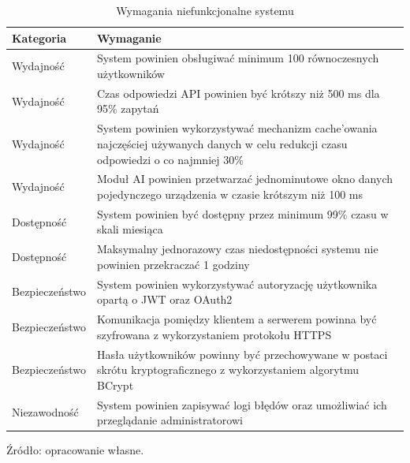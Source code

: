 \begin{table}[H]
	\centering
	\caption{Wymagania niefunkcjonalne systemu}
	\label{tab:nonfunctional-requirements}
	\vspace{10pt}
	
	\begin{tabular}{p{3cm} p{10cm}}
		\toprule
		Kategoria & Wymaganie \\
		\midrule
		
		Wydajność & System powinien obsługiwać minimum 100 równoczesnych użytkowników \\
		
		Wydajność & Czas odpowiedzi API powinien być krótszy niż 500 ms dla 95\% zapytań \\
		
		Wydajność & System powinien wykorzystywać mechanizm cache’owania najczęściej używanych danych w celu redukcji czasu odpowiedzi o co najmniej 30\% \\
		
		Wydajność & Moduł AI powinien przetwarzać jednominutowe okno danych pojedynczego urządzenia w czasie krótszym niż 100 ms \\
		
		Dostępność & System powinien być dostępny przez minimum 99\% czasu w skali miesiąca \\
		
		Dostępność & Maksymalny jednorazowy czas niedostępności systemu nie powinien przekraczać 1 godziny \\
		
		Bezpieczeństwo & System powinien wykorzystywać autoryzację użytkownika opartą o JWT oraz OAuth2 \\
		
		Bezpieczeństwo & Komunikacja pomiędzy klientem a serwerem powinna być szyfrowana z wykorzystaniem protokołu HTTPS \\
		
		Bezpieczeństwo & Hasła użytkowników powinny być przechowywane w postaci skrótu kryptograficznego z wykorzystaniem algorytmu BCrypt \\
		
		Niezawodność & System powinien zapisywać logi błędów oraz umożliwiać ich przeglądanie administratorowi \\
		
		\bottomrule
	\end{tabular}
	
	\vspace{10pt}
	\small Źródło: opracowanie własne.
\end{table}

